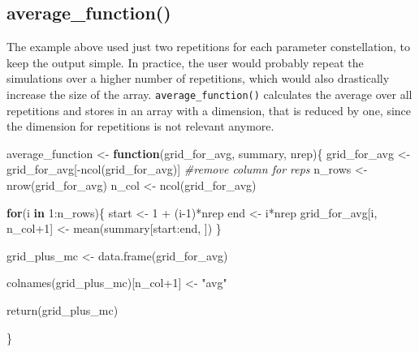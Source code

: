 \documentclass[11pt,a4paper]{article}
\newenvironment{Shaded}{\begin{snugshade}}{\end{snugshade}}
\newcommand{\CommentTok}[1]{\textcolor[rgb]{0.56,0.35,0.01}{\textit{#1}}}
\newcommand{\ControlFlowTok}[1]{\textcolor[rgb]{0.13,0.29,0.53}{\textbf{#1}}}
\newcommand{\DecValTok}[1]{\textcolor[rgb]{0.00,0.00,0.81}{#1}}
\newcommand{\FunctionTok}[1]{\textcolor[rgb]{0.00,0.00,0.00}{#1}}
\newcommand{\NormalTok}[1]{#1}
\newcommand{\OtherTok}[1]{\textcolor[rgb]{0.56,0.35,0.01}{#1}}
\newcommand{\SpecialCharTok}[1]{\textcolor[rgb]{0.00,0.00,0.00}{#1}}
\newcommand{\StringTok}[1]{\textcolor[rgb]{0.31,0.60,0.02}{#1}}
\begin{document}
\hypertarget{average_function}{%
\subsection{average\_function()}\label{average_function}}

The example above used just two repetitions for each parameter
constellation, to keep the output simple. In practice, the user would
probably repeat the simulations over a higher number of repetitions,
which would also drastically increase the size of the array.
\texttt{average\_function()} calculates the average over all repetitions
and stores in an array with a dimension, that is reduced by one, since
the dimension for repetitions is not relevant anymore.

\begin{Shaded}
\begin{Highlighting}[]
\NormalTok{average\_function }\OtherTok{\textless{}{-}} \ControlFlowTok{function}\NormalTok{(grid\_for\_avg, summary, nrep)\{}
\NormalTok{  grid\_for\_avg }\OtherTok{\textless{}{-}}\NormalTok{ grid\_for\_avg[}\SpecialCharTok{{-}}\FunctionTok{ncol}\NormalTok{(grid\_for\_avg)] }\CommentTok{\#remove column for reps}
\NormalTok{  n\_rows }\OtherTok{\textless{}{-}} \FunctionTok{nrow}\NormalTok{(grid\_for\_avg)}
\NormalTok{  n\_col }\OtherTok{\textless{}{-}} \FunctionTok{ncol}\NormalTok{(grid\_for\_avg)}
  
  \ControlFlowTok{for}\NormalTok{(i }\ControlFlowTok{in} \DecValTok{1}\SpecialCharTok{:}\NormalTok{n\_rows)\{}
\NormalTok{    start }\OtherTok{\textless{}{-}} \DecValTok{1} \SpecialCharTok{+}\NormalTok{ (i}\DecValTok{{-}1}\NormalTok{)}\SpecialCharTok{*}\NormalTok{nrep}
\NormalTok{    end }\OtherTok{\textless{}{-}}\NormalTok{ i}\SpecialCharTok{*}\NormalTok{nrep}
\NormalTok{    grid\_for\_avg[i, n\_col}\SpecialCharTok{+}\DecValTok{1}\NormalTok{] }\OtherTok{\textless{}{-}} \FunctionTok{mean}\NormalTok{(summary[start}\SpecialCharTok{:}\NormalTok{end, ])}
\NormalTok{  \}}
  
\NormalTok{  grid\_plus\_mc }\OtherTok{\textless{}{-}} \FunctionTok{data.frame}\NormalTok{(grid\_for\_avg)}
  
  \FunctionTok{colnames}\NormalTok{(grid\_plus\_mc)[n\_col}\SpecialCharTok{+}\DecValTok{1}\NormalTok{] }\OtherTok{\textless{}{-}} \StringTok{"avg"}
  
  \FunctionTok{return}\NormalTok{(grid\_plus\_mc)}
  
\NormalTok{\}}
\end{Highlighting}
\end{Shaded}
\end{document}
